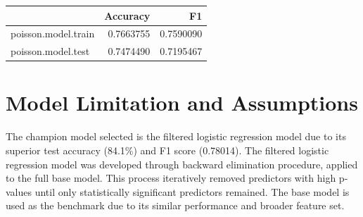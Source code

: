 \documentclass[
  letterpaper,
  DIV=11,
  numbers=noendperiod]{scrartcl}
\newenvironment{Shaded}{\begin{snugshade}}{\end{snugshade}}
\newcommand{\AttributeTok}[1]{\textcolor[rgb]{0.40,0.45,0.13}{#1}}
\newcommand{\FunctionTok}[1]{\textcolor[rgb]{0.28,0.35,0.67}{#1}}
\newcommand{\NormalTok}[1]{\textcolor[rgb]{0.00,0.23,0.31}{#1}}
\newcommand{\OtherTok}[1]{\textcolor[rgb]{0.00,0.23,0.31}{#1}}
\newcommand{\SpecialCharTok}[1]{\textcolor[rgb]{0.37,0.37,0.37}{#1}}
\newcommand{\StringTok}[1]{\textcolor[rgb]{0.13,0.47,0.30}{#1}}
\begin{document}
\begin{Shaded}
\end{Shaded}

\begin{longtable}[]{@{}lrr@{}}
\toprule\noalign{}
& Accuracy & F1 \\
\midrule\noalign{}
\endhead
\bottomrule\noalign{}
\endlastfoot
poisson.model.train & 0.7663755 & 0.7590090 \\
poisson.model.test & 0.7474490 & 0.7195467 \\
\end{longtable}

\section{Model Limitation and
Assumptions}\label{model-limitation-and-assumptions}

The champion model selected is the filtered logistic regression model
due to its superior test accuracy (84.1\%) and F1 score (0.78014). The
filtered logistic regression model was developed through backward
elimination procedure, applied to the full base model. This process
iteratively removed predictors with high p-values until only
statistically significant predictors remained. The base model is used as
the benchmark due to its similar performance and broader feature set.
\end{document}
